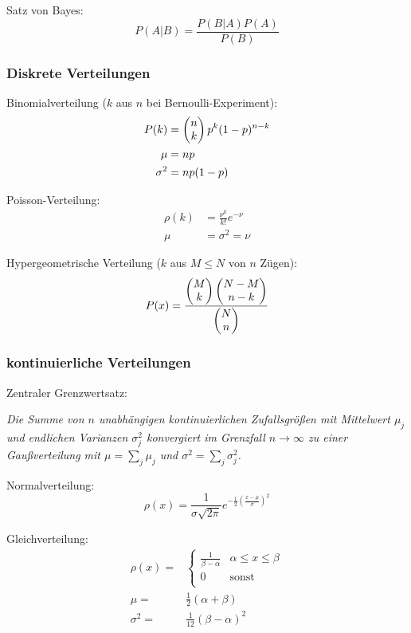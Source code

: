 			\noindent
			Satz von Bayes:
			\begin{equation}
				P(A|B) = \frac{P(B|A)P(A)}{P(B)}
			\end{equation}

		\subsubsection{Diskrete Verteilungen}
			\noindent
			Binomialverteilung ($k$ aus $n$ bei Bernoulli-Experiment):
			\begin{equation}
				\begin{aligned}
					P(k)&=\left(\begin{matrix}n\\k\end{matrix}\right)p^k(1-p)^{n-k} \\
					\mu &= np \\
					\sigma^2 &= np(1-p)
				\end{aligned}
			\end{equation}

			\noindent
			Poisson-Verteilung:
			\begin{equation}
				\begin{aligned}
					\rho(k) &= \frac{\nu^k}{k!} e^{-\nu} \\
					\mu &= \sigma^2 = \nu
				\end{aligned}
			\end{equation}

			\noindent
			Hypergeometrische Verteilung ($k$ aus $M\le N$ von $n$ Zügen):
			\begin{equation}
				P(x)=\frac{\left(\begin{matrix}M\\k\end{matrix}\right)\left(\begin{matrix}N-M\\n-k\end{matrix}\right)}{\left(\begin{matrix}N\\n\end{matrix}\right)}
			\end{equation}

		\subsubsection{kontinuierliche Verteilungen}
			\noindent
			Zentraler Grenzwertsatz: \par
				\emph{Die Summe von $n$ unabhängigen kontinuierlichen Zufallsgrößen mit Mittelwert $\mu_j$ und endlichen Varianzen $\sigma_j^2$ konvergiert im Grenzfall $n\rightarrow \infty$ zu einer Gaußverteilung mit $\mu = \sum_j \mu_j$ und $\sigma^2 = \sum_j \sigma_j^2$.} \vsp

			\noindent
			Normalverteilung:
			\begin{equation}
				\rho(x)=\frac{1}{\sigma\sqrt{2\pi}}e^{-\frac{1}{2}\left(\frac{x-\mu}{\sigma}\right)^2}
			\end{equation}

			\noindent
			Gleichverteilung:
			\begin{equation}
				\begin{aligned}
					\rho(x) =& \left\{\begin{array}{ll}
					\frac{1}{\beta-\alpha} & \alpha\le x\le \beta \\
					0 & \text{sonst} \\
					\end{array}\right. \\
					\mu =& \frac{1}{2}(\alpha+\beta) \\
					\sigma^2 =& \frac{1}{12}(\beta-\alpha)^2 \\
				\end{aligned}
			\end{equation}
